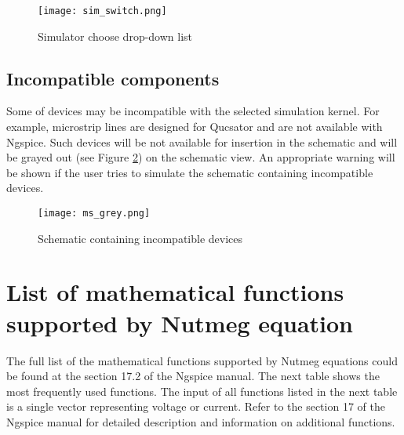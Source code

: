     \begin{figure}[!ht]
    \begin{center}
        \texttt{[image: sim\_switch.png]}
    \end{center}
    \caption{Simulator choose drop-down list} \label{fig:sim_switch}
    \end{figure}

\subsection{Incompatible components}

Some of devices may be incompatible with the selected simulation kernel. For example, microstrip lines are designed for Qucsator and are not available with Ngspice. Such devices will be not available for insertion in the schematic and will be grayed out (see Figure \ref{fig:grey}) on the schematic view. An appropriate warning will be shown if the user tries to simulate the schematic containing incompatible devices.

    \begin{figure}[!ht]
    \begin{center}
        \texttt{[image: ms\_grey.png]}
    \end{center}
    \caption{Schematic containing incompatible devices} \label{fig:grey}
    \end{figure}

\section{List of mathematical functions supported by Nutmeg equation}

The full list of the mathematical functions supported by Nutmeg equations could be found at the section 17.2 of the Ngspice manual. The next table shows the most frequently used functions. The input of all functions listed in the next table is a single vector representing voltage or current. Refer to the section 17 of the Ngspice manual for detailed description and information on additional functions.

